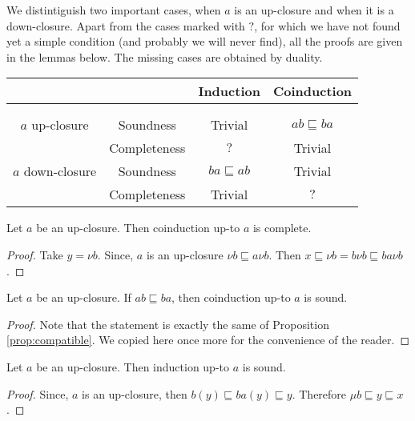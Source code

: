 \documentclass[smallcondensed,envcountsect,envcountsame]{svjour3}     %
\begin{document}
We distintiguish two important cases, when $a$ is an up-closure and when it is a down-closure.  Apart from the cases marked with $?$, for which we have not found yet a simple condition (and probably we will never find), all the proofs are given in the lemmas below. The missing cases are obtained by duality.

\begin{center}
\begin{tabular}{cccc}
& & Induction & Coinduction \\
\hline \\
\hline \\
$a$ up-closure  & Soundness & Trivial & $ab\sqsubseteq ba$ \\
                          & Completeness & $?$ & Trivial \\
                     \hline
$a$ down-closure  & Soundness & $ba\sqsubseteq ab$ & Trivial \\
                          & Completeness & Trivial & $?$ \\                          
\end{tabular}
\end{center}



\begin{lemma}
Let $a$ be an up-closure. Then coinduction up-to $a$ is complete.
\end{lemma}
\begin{proof} 
Take $y=\nu b$. Since, $a$ is an up-closure $\nu b \sqsubseteq a \nu b$. Then $x\sqsubseteq \nu b =b \nu b \sqsubseteq ba\nu b$.
\end{proof}

\begin{lemma}
Let $a$ be an up-closure. If $ab\sqsubseteq ba$, then coinduction up-to $a$ is sound.
\end{lemma}
\begin{proof}
Note that the statement is exactly the same of Proposition \ref{prop:compatible}. We copied here once more for the convenience of the reader.
\end{proof}


\begin{lemma}
Let $a$ be an up-closure. Then induction up-to $a$ is sound.
\end{lemma}
\begin{proof} 
Since, $a$ is an up-closure, then $b(y) \sqsubseteq ba(y) \sqsubseteq y$. Therefore $\mu b \sqsubseteq y \sqsubseteq x$.
\end{proof}
\end{document}
